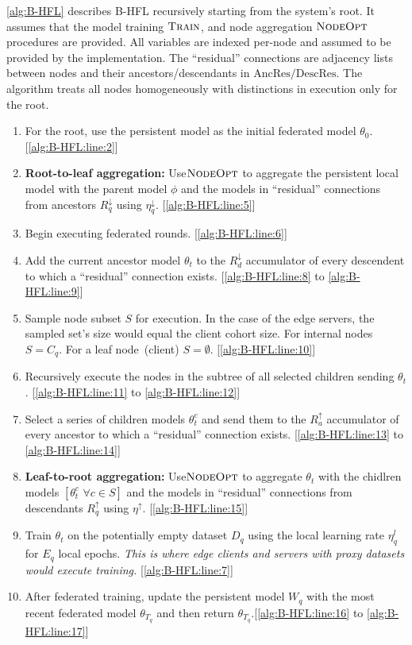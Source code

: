 \cref{alg:B-HFL} describes B-HFL recursively starting from the system's root. It assumes that the model training $\textsc{Train}$, and node aggregation $\textsc{NodeOpt}$ procedures are provided. All variables are indexed per-node and assumed to be provided by the implementation. The ``residual'' connections are adjacency lists between nodes and their ancestors/descendants in $\mathrm{AncRes}/\mathrm{DescRes}$. The algorithm treats all nodes homogeneously with distinctions in execution only for the root.
\begin{enumerate}
    \item For the root, use the persistent model as the initial federated model $\theta_0$.  [\cref{alg:B-HFL:line:2}]

    \item \textbf{Root-to-leaf aggregation:} Use$\textsc{NodeOpt}$ to aggregate the persistent local model with the parent model $\phi$ and the models in ``residual'' connections from ancestors $R^\downarrow_q$ using $\eta^\downarrow_q$. [\cref{alg:B-HFL:line:5}]
    \item Begin executing federated rounds. [\cref{alg:B-HFL:line:6}]

    \item Add the current ancestor model $\theta_t$ to the $R^\downarrow_d$ accumulator of every descendent to which a ``residual'' connection exists. [\cref{alg:B-HFL:line:8} to \cref{alg:B-HFL:line:9}]
    \item Sample node subset $S$ for execution. In the case of the edge servers, the sampled set's size would equal the client cohort size. For internal nodes $S = C_q$. For a leaf node~(client) $S = \emptyset$. [\cref{alg:B-HFL:line:10}]
    \item Recursively execute the nodes in the subtree of all selected children sending $\theta_t$.  [\cref{alg:B-HFL:line:11} to \cref{alg:B-HFL:line:12}]
    \item Select a series of children models $\theta_t^c$ and send them to the $R^\uparrow_a$ accumulator of every ancestor to which a ``residual'' connection exists. [\cref{alg:B-HFL:line:13} to \cref{alg:B-HFL:line:14}]
    \item \textbf{Leaf-to-root aggregation:} Use$\textsc{NodeOpt}$ to aggregate $\theta_t$ with the chidlren models $[\theta^c_t \,\, \forall c \in S]$ and the models in ``residual'' connections from descendants $R^\uparrow_q$ using $\eta^\uparrow$.  [\cref{alg:B-HFL:line:15}]
    \item Train $\theta_t$ on the potentially empty dataset $D_q$ using the local learning rate $\eta^l_q$ for $E_q$ local epochs. \textit{This is where edge clients and servers with proxy datasets would execute training.} [\cref{alg:B-HFL:line:7}]
    \item After federated training, update the persistent model $W_q$ with the most recent federated model $\theta_{T_q}$ and then return $\theta_{T_q}$.[\cref{alg:B-HFL:line:16} to \cref{alg:B-HFL:line:17}]


\end{enumerate}

